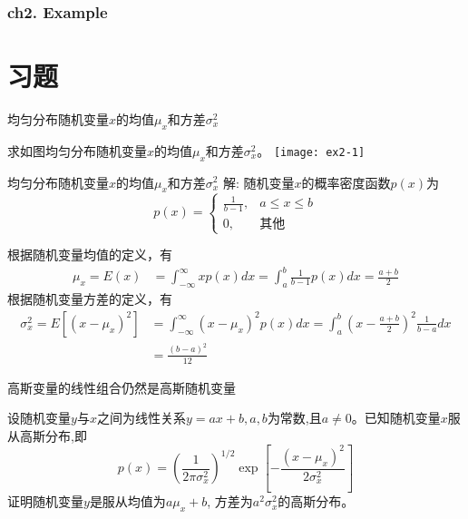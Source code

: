 \begin{frame}[shrink]
\frametitle{ch2. Example}
\tableofcontents%
\end{frame}

\section{习题}

\begin{frame}{均匀分布随机变量$x$的均值$\mu_x$和方差$\sigma_x^2$}
\begin{example}
求如图均匀分布随机变量$x$的均值$\mu_x$和方差$\sigma_x^2$。
\texttt{[image: ex2-1]}
\end{example}
\end{frame}

\begin{frame}{均匀分布随机变量$x$的均值$\mu_x$和方差$\sigma_x^2$}
解: 随机变量$x$的概率密度函数$p(x)$为
\[p(x)=\begin{cases}
\frac{1}{b-1}, &a\le x\le b\\
0, &\text{其他}
\end{cases} \]

	根据随机变量均值的定义，有
	\begin{align*}
	\mu_x=E(x)&=\int_{-\infty}^{\infty}xp(x)dx=\int_{a}^{b}\frac{1}{b-1}p(x)dx =\frac{a+b}{2}
	\end{align*}
	根据随机变量方差的定义，有
	\begin{align*}
	\sigma_x^2=E[(x-\mu_x)^2]&=\int_{-\infty}^{\infty}(x-\mu_x)^2p(x)dx=\int_{a}^{b}\left(x-\frac{a+b}{2}\right)^2\frac{1}{b-a}dx \\
	&=\frac{(b-a)^2}{12}
	\end{align*}	
\end{frame}

\begin{frame}{高斯变量的线性组合仍然是高斯随机变量}
\begin{example}
	设随机变量$y$与$x$之间为线性关系$y=ax+b,a,b$为常数,且$a\ne 0$。已知随机变量$x$服从高斯分布,即
	\[p(x)=\left(\frac{1}{2\pi\sigma_x^2}\right)^{1/2}\exp\left[-\frac{(x-\mu_x)^2}{2\sigma_x^2}\right] \]
	证明随机变量$y$是服从均值为$a\mu_x+b$, 方差为$a^2\sigma_x^2$的高斯分布。
\end{example}
\end{frame}

